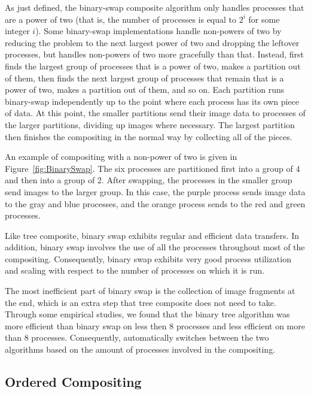 As just defined, the binary-swap composite algorithm only handles processes
that are a power of two (that is, the number of processes is equal to $2^i$
for some integer $i$).  Some binary-swap implementations handle non-powers
of two by reducing the problem to the next largest power of two and
dropping the leftover processes, but \IceT handles non-powers of two more
gracefully than that.  Instead, \IceT first finds the largest group of
processes that is a power of two, makes a partition out of them, then finds
the next largest group of processes that remain that is a power of two,
makes a partition out of them, and so on.  Each partition runs binary-swap
independently up to the point where each process has its own piece of data.
At this point, the smaller partitions send their image data to processes of
the larger partitions, dividing up images where necessary.  The largest
partition then finishes the compositing in the normal way by collecting all
of the pieces.

An example of compositing with a non-power of two is given in
Figure~\ref{fig:BinarySwap}.  The six processes are partitioned first into
a group of 4 and then into a group of 2.  After swapping, the processes in
the smaller group send images to the larger group.  In this case, the purple
process sends image data to the gray and blue processes, and the orange
process sends to the red and green processes.

Like tree composite, binary swap exhibits regular and efficient data
transfers.  In addition, binary swap involves the use of all the processes
throughout most of the compositing.  Consequently, binary swap exhibits
very good process utilization and scaling with respect to the number of
processes on which it is run.

The most inefficient part of binary swap is the collection of image
fragments at the end, which is an extra step that tree composite does not
need to take.  Through some empirical studies, we found that the binary
tree algorithm was more efficient than binary swap on less then 8 processes and
less efficient on more than 8 processes.  Consequently, \IceT automatically
switches between the two algorithms based on the amount of processes
involved in the compositing.


\subsection{Ordered Compositing}

